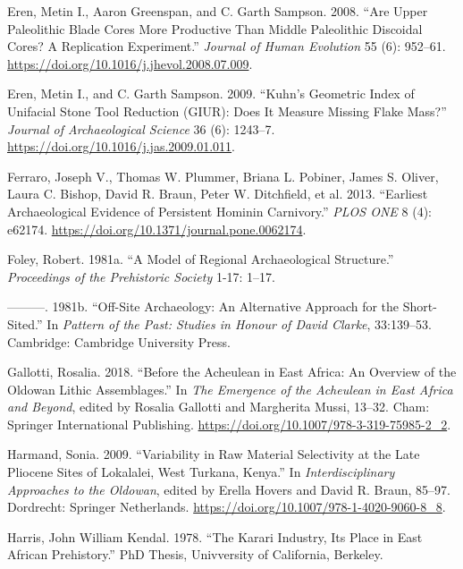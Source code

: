 \documentclass[]{elsarticle} %
\begin{document}
\leavevmode\hypertarget{ref-erenAreUpperPaleolithic2008}{}%
Eren, Metin I., Aaron Greenspan, and C. Garth Sampson. 2008. ``Are Upper
Paleolithic Blade Cores More Productive Than Middle Paleolithic
Discoidal Cores? A Replication Experiment.'' \emph{Journal of Human
Evolution} 55 (6): 952--61.
\url{https://doi.org/10.1016/j.jhevol.2008.07.009}.

\leavevmode\hypertarget{ref-erenKuhnGeometricIndex2009}{}%
Eren, Metin I., and C. Garth Sampson. 2009. ``Kuhn's Geometric Index of
Unifacial Stone Tool Reduction (GIUR): Does It Measure Missing Flake
Mass?'' \emph{Journal of Archaeological Science} 36 (6): 1243--7.
\url{https://doi.org/10.1016/j.jas.2009.01.011}.

\leavevmode\hypertarget{ref-ferraroEarliestArchaeologicalEvidence2013}{}%
Ferraro, Joseph V., Thomas W. Plummer, Briana L. Pobiner, James S.
Oliver, Laura C. Bishop, David R. Braun, Peter W. Ditchfield, et al.
2013. ``Earliest Archaeological Evidence of Persistent Hominin
Carnivory.'' \emph{PLOS ONE} 8 (4): e62174.
\url{https://doi.org/10.1371/journal.pone.0062174}.

\leavevmode\hypertarget{ref-foleyModelRegionalArchaeological1981}{}%
Foley, Robert. 1981a. ``A Model of Regional Archaeological Structure.''
\emph{Proceedings of the Prehistoric Society} 1-17: 1--17.

\leavevmode\hypertarget{ref-foleyOffsiteArchaeologyAlternative1981}{}%
---------. 1981b. ``Off-Site Archaeology: An Alternative Approach for
the Short-Sited.'' In \emph{Pattern of the Past: Studies in Honour of
David Clarke}, 33:139--53. Cambridge: Cambridge University Press.

\leavevmode\hypertarget{ref-gallottiAcheuleanEastAfrica2018}{}%
Gallotti, Rosalia. 2018. ``Before the Acheulean in East Africa: An
Overview of the Oldowan Lithic Assemblages.'' In \emph{The Emergence of
the Acheulean in East Africa and Beyond}, edited by Rosalia Gallotti and
Margherita Mussi, 13--32. Cham: Springer International Publishing.
\url{https://doi.org/10.1007/978-3-319-75985-2_2}.

\leavevmode\hypertarget{ref-harmandVariabilityRawMaterial2009}{}%
Harmand, Sonia. 2009. ``Variability in Raw Material Selectivity at the
Late Pliocene Sites of Lokalalei, West Turkana, Kenya.'' In
\emph{Interdisciplinary Approaches to the Oldowan}, edited by Erella
Hovers and David R. Braun, 85--97. Dordrecht: Springer Netherlands.
\url{https://doi.org/10.1007/978-1-4020-9060-8_8}.

\leavevmode\hypertarget{ref-harrisKarariIndustryIts1978}{}%
Harris, John William Kendal. 1978. ``The Karari Industry, Its Place in
East African Prehistory.'' PhD Thesis, Univversity of California,
Berkeley.
\end{document}
